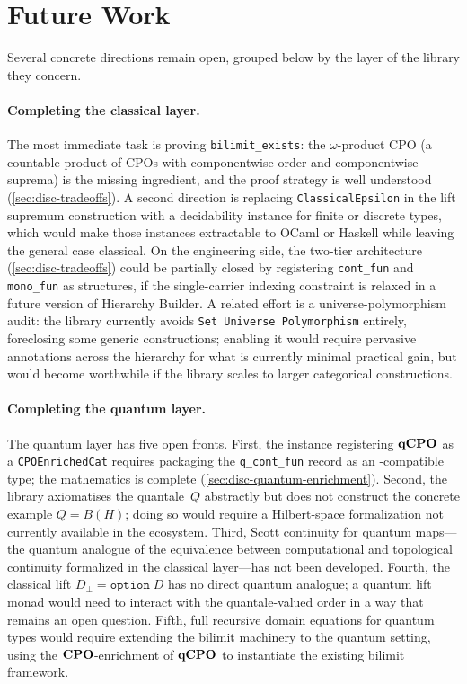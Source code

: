 \section{Future Work}
\label{sec:conc-future}

Several concrete directions remain open, grouped below by
the layer of the library they concern.

\paragraph{Completing the classical layer.}
The most immediate task is proving \texttt{bilimit\_exists}: the
$\omega$-product CPO (a countable product of CPOs with componentwise
order and componentwise suprema) is the missing ingredient, and the
proof strategy is well understood (\cref{sec:disc-tradeoffs}).
A second direction is replacing \texttt{ClassicalEpsilon} in the
lift supremum construction with a decidability instance for finite
or discrete types, which would make those instances extractable to
OCaml or Haskell while leaving the general case classical.
On the engineering side, the two-tier architecture
(\cref{sec:disc-tradeoffs}) could be partially closed by registering
\texttt{cont\_fun} and \texttt{mono\_fun} as \HB{} structures, if
the single-carrier indexing constraint is relaxed in a future version
of Hierarchy Builder.
A related effort is a universe-polymorphism audit: the library
currently avoids \texttt{Set Universe Polymorphism} entirely,
foreclosing some generic constructions; enabling it would require
pervasive annotations across the hierarchy for what is currently
minimal practical gain, but would become worthwhile if the library
scales to larger categorical constructions.

\paragraph{Completing the quantum layer.}
The quantum layer has five open fronts.
First, the \HB{} instance registering $\mathbf{qCPO}$ as a
\texttt{CPOEnrichedCat} requires packaging the \texttt{q\_cont\_fun}
record as an \HB{}-compatible type; the mathematics is complete
(\cref{sec:disc-quantum-enrichment}).
Second, the library axiomatises the quantale~$Q$ abstractly but does
not construct the concrete example $Q = B(H)$; doing so would
require a Hilbert-space formalization not currently available in the
\Rocq{} ecosystem.
Third, Scott continuity for quantum maps---the quantum analogue of
the equivalence between computational and topological continuity
formalized in the classical layer---has not been developed.
Fourth, the classical lift $D_\bot = \texttt{option}\;D$ has no
direct quantum analogue; a quantum lift monad would need to interact
with the quantale-valued order in a way that remains an open
question.
Fifth, full recursive domain equations for quantum types would
require extending the bilimit machinery to the quantum setting,
using the $\mathbf{CPO}$-enrichment of $\mathbf{qCPO}$ to instantiate the existing
bilimit framework.

